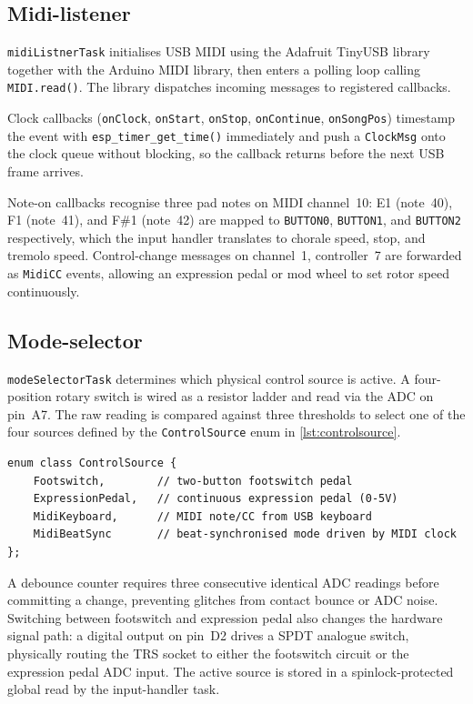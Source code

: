 \subsection{Midi-listener}
\texttt{midiListnerTask} initialises USB MIDI using the Adafruit TinyUSB library together with
the Arduino MIDI library, then enters a polling loop calling \texttt{MIDI.read()}.
The library dispatches incoming messages to registered callbacks.

Clock callbacks (\texttt{onClock}, \texttt{onStart}, \texttt{onStop}, \texttt{onContinue}, \texttt{onSongPos})
timestamp the event with \texttt{esp\_timer\_get\_time()} immediately and push a \texttt{ClockMsg}
onto the clock queue without blocking, so the callback returns before the next USB frame arrives.

Note-on callbacks recognise three pad notes on MIDI channel~10:
E1 (note~40), F1 (note~41), and F\#1 (note~42) are mapped to \texttt{BUTTON0}, \texttt{BUTTON1},
and \texttt{BUTTON2} respectively, which the input handler translates to chorale speed, stop, and tremolo speed.
Control-change messages on channel~1, controller~7 are forwarded as \texttt{MidiCC} events,
allowing an expression pedal or mod wheel to set rotor speed continuously.

\subsection{Mode-selector}
\texttt{modeSelectorTask} determines which physical control source is active.
A four-position rotary switch is wired as a resistor ladder and read via the ADC on pin~A7.
The raw reading is compared against three thresholds to select one of the four sources
defined by the \texttt{ControlSource} enum in \autoref{lst:controlsource}.

\begin{listing}[H]
	\begin{verbatim}
enum class ControlSource {
    Footswitch,        // two-button footswitch pedal
    ExpressionPedal,   // continuous expression pedal (0-5V)
    MidiKeyboard,      // MIDI note/CC from USB keyboard
    MidiBeatSync       // beat-synchronised mode driven by MIDI clock
};
\end{verbatim}
	\caption{\texttt{ControlSource} enum defining the four selectable input sources.}
	\label{lst:controlsource}
\end{listing}

A debounce counter requires three consecutive identical ADC readings before committing a change,
preventing glitches from contact bounce or ADC noise.
Switching between footswitch and expression pedal also changes the hardware signal path:
a digital output on pin~D2 drives a SPDT analogue switch, physically routing the TRS socket
to either the footswitch circuit or the expression pedal ADC input.
The active source is stored in a spinlock-protected global read by the input-handler task.

